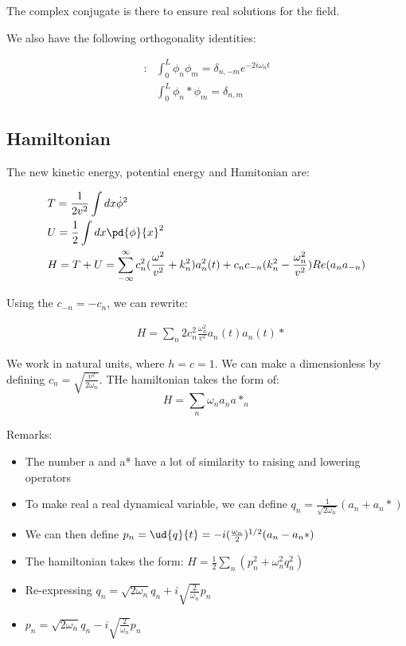 The complex conjugate is there to ensure real solutions for the field.

We also have the following orthogonality identities:

\begin{align}:
    &\int_0^L \phi_n \phi_m = \delta_{n,-m} e^{-2i\omega_n t} \\
    &\int_0^L \phi_n* \phi_m = \delta_{n,m}
\end{align}

\subsection{Hamiltonian}

The new kinetic energy, potential energy and Hamitonian are:

\begin{align}
    & T = \frac{1}{2v^2} \int dx \dot{\phi}^2 \\
    & U = \frac{1}{2} \int dx \pd{\phi}{x}^2 \\
    & H = T + U = \sum_{-\infty}^{\infty} c_n^2(\frac{\omega^2}{v^2} + k_n^2) a_n^2(t) + c_n c_{-n} (k_n^2 - \frac{\omega_n^2}{v^2})Re(a_n a_{-n}) \\
\end{align}

Using the \(c_{-n} = -c_n\), we can rewrite:

\begin{align}
    & H = \sum_n 2 c_n^2 \frac{\omega_n^2}{v^2} a_n(t) a_n(t)*
\end{align}

We work in natural units, where \(h = c = 1\).  
We can make a dimensionless by defining \(c_n = \sqrt{\frac{v^2}{2 \omega_n}}\).
THe hamiltonian takes the form of:
\[H = \sum_n \omega_n a_n a*_n\]

Remarks:

\begin{itemize}
    \item The number a and a* have a lot of similarity to raising and lowering operators
    \item To make real a real dynamical variable, we can define \(q_n = \frac{1}{\sqrt{2 \omega_n}}(a_n + a_n*)\)
    \item We can then define \(p_n = \ud{q}{t} = - i (\frac{\omega_n}{2})^{1/2} (a_n - a_n*)\)
    \item The hamiltonian takes the form: \(H = \frac12 \sum_n (p_n^2 + \omega_n^2 q_n^2)\)
    \item Re-expressing \(q_n = \sqrt{2\omega_n} q_n + i \sqrt{\frac{2}{\omega_n}} p_n\)
    \item \(p_n = \sqrt{2\omega_n} q_n - i \sqrt{\frac{2}{\omega_n}} p_n\)
\end{itemize}



